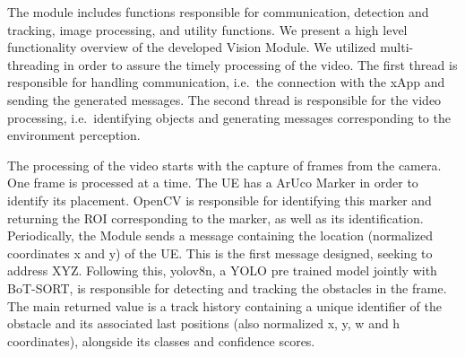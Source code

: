 \begin{table}[H]
    \caption{Summary of each message type}
    \label{tab:message_type}
    \centering
\end{table}

The module includes functions responsible for communication, detection and tracking, image processing, and utility functions.
We present a high level functionality overview of the developed Vision Module.
We utilized multi-threading in order to assure the timely processing of the video.
The first thread is responsible for handling communication, i.e.\ the connection with the xApp and sending the generated messages.
The second thread is responsible for the video processing, i.e.\ identifying objects and generating messages corresponding to the environment perception.

The processing of the video starts with the capture of frames from the camera.
One frame is processed at a time.
The UE has a ArUco Marker in order to identify its placement.
OpenCV is responsible for identifying this marker and returning the ROI corresponding to the marker, as well as its identification.
Periodically, the Module sends a message containing the location (normalized coordinates x and y) of the UE\@.
This is the first message designed, seeking to address XYZ. %
Following this, yolov8n, a YOLO pre trained model jointly with BoT-SORT, is responsible for detecting and tracking the obstacles in the frame.
The main returned value is a track history containing a unique identifier of the obstacle and its associated last positions (also normalized x, y, w and h coordinates), alongside its classes and confidence scores.

